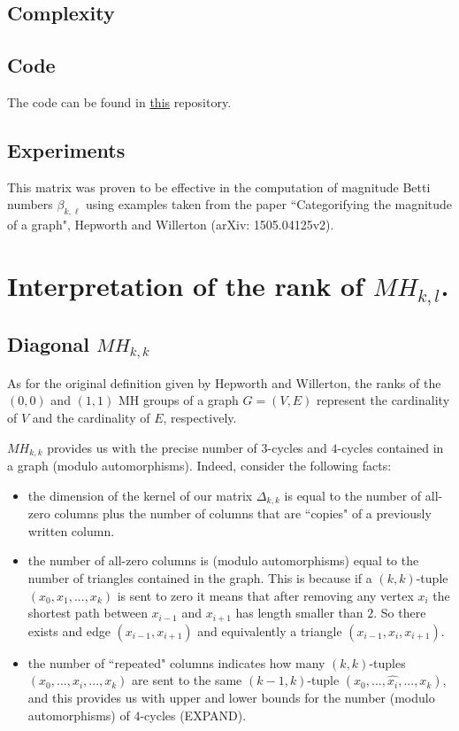 \documentclass{article}
\begin{document}
	\subsection{Complexity}
	
	\subsection{Code}
	The code can be found in \href{https://github.com/GMenara/magnitude-homology-calculations}{this} repository. 
	
	\subsection{Experiments}
	This matrix was proven to be effective in the computation of magnitude Betti numbers $\beta_{k,\ell}$ using examples taken from the paper ``Categorifying the magnitude of a graph", Hepworth and Willerton (arXiv: 1505.04125v2).  
	
	\section{Interpretation of the rank of $MH_{k,l}$.}
	
	\subsection{Diagonal $MH_{k,k}$}
	As for the original definition given by Hepworth and Willerton, the ranks of the $(0,0)$ and $(1,1)$ MH groups of a graph $G=(V,E)$ represent the cardinality of $V$ and the cardinality of $E$, respectively. 
	\medskip
	
	$MH_{k,k}$ provides us with the precise number of $3$-cycles and $4$-cycles contained in a graph (modulo automorphisms). 
	Indeed, consider the following facts:
	\begin{itemize}
		\item the dimension of the kernel of our matrix $\Delta_{k,k}$ is equal to the number of all-zero columns plus the number of columns that are ``copies" of a previously written column.
		\item the number of all-zero columns is (modulo automorphisms) equal to the number of triangles contained in the graph. This is because if a $(k,k)$-tuple $(x_0,x_1,...,x_k)$ is sent to zero it means that after removing any vertex $x_i$  the shortest path between $x_{i-1}$ and $x_{i+1}$ has length smaller than $2$. So there exists and edge $(x_{i-1},x_{i+1})$ and equivalently a triangle $(x_{i-1},x_i,x_{i+1})$.
		\item the number of ``repeated" columns indicates how many $(k,k)$-tuples $(x_0,...,x_i,...,x_k)$ are sent to the same $(k-1,k)$-tuple $(x_0,...,\hat{x_i},...,x_k)$, and this provides us with upper and lower bounds for the number (modulo automorphisms) of $4$-cycles (EXPAND).
	\end{itemize}
	
\end{document}
